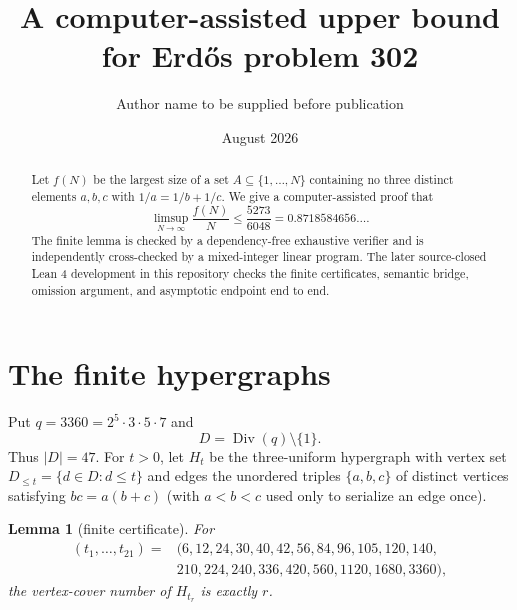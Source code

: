 \documentclass[11pt]{article}
\title{A computer-assisted upper bound for Erd\H{o}s problem 302}
\author{Author name to be supplied before publication}
\date{August 2026}
\newtheorem{lemma}{Lemma}
\begin{document}
\thispagestyle{empty}
\vspace*{\fill}
\begin{center}
\end{center}
\vspace*{\fill}
\clearpage
\setcounter{page}{1}

\maketitle

\begin{abstract}
Let $f(N)$ be the largest size of a set $A\subseteq\{1,\ldots,N\}$
containing no three distinct elements $a,b,c$ with
$1/a=1/b+1/c$.  We give a computer-assisted proof that
\[
  \limsup_{N\to\infty}\frac{f(N)}N\leq \frac{5273}{6048}
  =0.8718584656\ldots .
\]
The finite lemma is checked by a dependency-free exhaustive verifier and is
independently cross-checked by a mixed-integer linear program.  The later
source-closed Lean 4 development in this repository checks the finite
certificates, semantic bridge, omission argument, and asymptotic endpoint end
to end.
\end{abstract}

\section{The finite hypergraphs}
Put $q=3360=2^5\cdot3\cdot5\cdot7$ and
\[
 D=\operatorname{Div}(q)\setminus\{1\}.
\]
Thus $|D|=47$.  For $t>0$, let $H_t$ be the three-uniform hypergraph with
vertex set $D_{\leq t}=\{d\in D:d\leq t\}$ and edges the unordered triples
$\{a,b,c\}$ of distinct vertices satisfying $bc=a(b+c)$ (with $a<b<c$ used
only to serialize an edge once).

\begin{lemma}[finite certificate]\label{lem:certificate}
For
\begin{align*}
(t_1,\ldots,t_{21})={}&(6,12,24,30,40,42,56,84,96,105,120,140,\\
&210,224,240,336,420,560,1120,1680,3360),
\end{align*}
the vertex-cover number of $H_{t_r}$ is exactly $r$.
\end{lemma}
\end{document}
